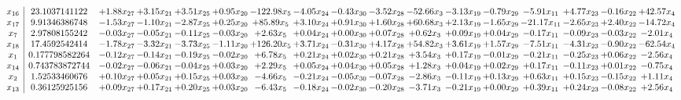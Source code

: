 \documentclass[9pt]{article}
\begin{document}
 \[\begin{array}{c| c c@{\hskip 2pt} c@{\hskip 2pt} c@{\hskip 2pt} c@{\hskip 2pt} c@{\hskip 2pt} c@{\hskip 2pt} c@{\hskip 2pt} c@{\hskip 2pt} c@{\hskip 2pt} c@{\hskip 2pt} c@{\hskip 2pt} c@{\hskip 2pt} c@{\hskip 2pt} c@{\hskip 2pt} c@{\hskip 2pt} }
 x_{16}   &  23.1037141122 & +  1.88 x_{27} & +  3.15 x_{21} & +  3.51 x_{25} & +  0.95 x_{20} & -122.98 x_{5} & -4.05 x_{24} & -0.43 x_{30} & -3.52 x_{28} & -52.66 x_{3} & -3.13 x_{19} & -0.79 x_{29} & -5.91 x_{11} & +  4.77 x_{23} & -0.16 x_{22} & + 42.57 x_{4}\\
 x_{17}   &  9.91346386748 & -1.53 x_{27} & -1.10 x_{21} & -2.87 x_{25} & +  0.25 x_{20} & + 85.89 x_{5} & +  3.10 x_{24} & +  0.91 x_{30} & +  1.60 x_{28} & + 60.68 x_{3} & +  2.13 x_{19} & -1.65 x_{29} & -21.17 x_{11} & -2.65 x_{23} & +  2.40 x_{22} & -14.72 x_{4}\\
 x_{7}   &  2.97808155242 & -0.03 x_{27} & -0.05 x_{21} & -0.11 x_{25} & -0.03 x_{20} & +  2.63 x_{5} & +  0.04 x_{24} & +  0.00 x_{30} & +  0.07 x_{28} & +  0.62 x_{3} & +  0.09 x_{19} & +  0.04 x_{29} & -0.17 x_{11} & -0.09 x_{23} & -0.03 x_{22} & -2.01 x_{4}\\
 x_{18}   &  17.4592542414 & -1.78 x_{27} & -3.32 x_{21} & -3.73 x_{25} & -1.11 x_{20} & + 126.20 x_{5} & +  3.71 x_{24} & -0.31 x_{30} & +  4.17 x_{28} & + 54.82 x_{3} & +  3.61 x_{19} & +  1.57 x_{29} & -7.51 x_{11} & -4.31 x_{23} & -0.90 x_{22} & -62.54 x_{4}\\
 x_{1}   &  0.177798582264 & -0.12 x_{27} & -0.14 x_{21} & -0.19 x_{25} & -0.02 x_{20} & +  6.78 x_{5} & +  0.21 x_{24} & +  0.02 x_{30} & +  0.21 x_{28} & +  3.54 x_{3} & +  0.17 x_{19} & -0.01 x_{29} & -0.21 x_{11} & -0.25 x_{23} & +  0.06 x_{22} & -2.56 x_{4}\\
 x_{14}   &  0.743783872744 & -0.02 x_{27} & -0.06 x_{21} & -0.04 x_{25} & +  0.03 x_{20} & +  2.29 x_{5} & +  0.05 x_{24} & +  0.04 x_{30} & +  0.05 x_{28} & +  1.28 x_{3} & +  0.04 x_{19} & +  0.02 x_{29} & +  0.17 x_{11} & -0.11 x_{23} & +  0.01 x_{22} & -0.75 x_{4}\\
 x_{2}   &  1.52533460676 & +  0.10 x_{27} & +  0.05 x_{21} & +  0.15 x_{25} & +  0.03 x_{20} & -4.66 x_{5} & -0.21 x_{24} & -0.05 x_{30} & -0.07 x_{28} & -2.86 x_{3} & -0.11 x_{19} & +  0.13 x_{29} & +  0.63 x_{11} & +  0.15 x_{23} & -0.15 x_{22} & +  1.11 x_{4}\\
 x_{13}   &  0.36125925156 & +  0.09 x_{27} & +  0.17 x_{21} & +  0.20 x_{25} & +  0.03 x_{20} & -6.43 x_{5} & -0.18 x_{24} & -0.02 x_{30} & -0.20 x_{28} & -3.71 x_{3} & -0.21 x_{19} & +  0.00 x_{29} & +  0.39 x_{11} & +  0.24 x_{23} & -0.08 x_{22} & +  2.56 x_{4}\\

\end{array}\]
\end{document}
